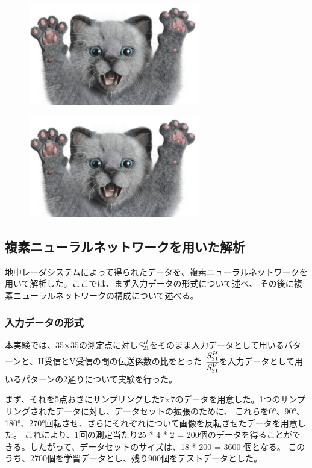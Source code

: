 \documentclass[11pt,a4paper,uplatex,draft]{ujarticle}
\begin{document}
  \begin{figure}[tbp]
    \begin{minipage}[b]{0.5\textwidth}
      \centering
      \includegraphics[keepaspectratio, width=75mm]{Images/sampleneko.png}
      \label{fig:center_offset}
    \end{minipage}
    \begin{minipage}[b]{0.5\textwidth}
      \centering
      \includegraphics[keepaspectratio, width=75mm]{Images/sampleneko.png}
      \label{fig:actual_msr_range}
    \end{minipage}
  \end{figure}


  \subsection{複素ニューラルネットワークを用いた解析}\label{sec:analysis}
  地中レーダシステムによって得られたデータを、複素ニューラルネットワークを用いて解析した。ここでは、まず入力データの形式について述べ、
  その後に複素ニューラルネットワークの構成について述べる。
  \subsubsection{入力データの形式}
  本実験では、35×35の測定点に対し$S_{21}^{H}$をそのまま入力データとして用いるパターンと、H受信とV受信の間の伝送係数の比をとった
  $\cfrac{S_{21}^{H}}{S_{21}^{V}}$を入力データとして用いるパターンの2通りについて実験を行った。

  まず、それを5点おきにサンプリングした7×7のデータを用意した。1つのサンプリングされたデータに対し、データセットの拡張のために、
  これらを0°、90°、180°、270°回転させ、さらにそれぞれについて画像を反転させたデータを用意した。
  これにより、1回の測定当たり25 * 4 * 2 = 200個のデータを得ることができる。したがって、データセットのサイズは、18 * 200 = 3600 個となる。
  このうち、2700個を学習データとし、残り900個をテストデータとした。
\end{document}
